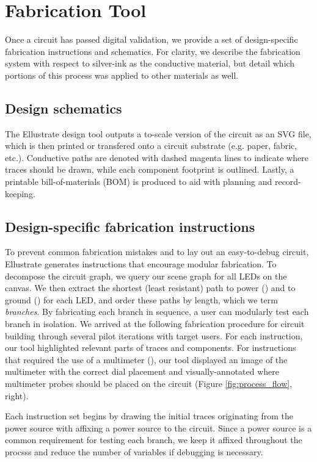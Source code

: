 \documentclass{sigchi}
\begin{document}
\section{Fabrication Tool}
    Once a circuit has passed digital validation, we provide a set of design-specific fabrication instructions and schematics. For clarity, we describe the fabrication system with respect to silver-ink as the conductive material, but detail which portions of this process was applied to other materials as well. 

    \subsection{Design schematics}
        The Ellustrate design tool outputs a to-scale version of the circuit as an SVG file, which is then printed or transfered onto a circuit substrate (e.g. paper, fabric, etc.). Conductive paths are denoted with dashed magenta lines to indicate where traces should be drawn, while each component footprint is outlined. Lastly, a printable bill-of-materials (BOM) is produced to aid with planning and record-keeping.
    \subsection{Design-specific fabrication instructions}
        To prevent common fabrication mistakes and to lay out an easy-to-debug circuit, Ellustrate generates instructions that encourage modular fabrication. To decompose the circuit graph, we query our scene graph for all LEDs on the canvas. We then extract the shortest (least resistant) path to power () and to ground () for each LED, and order these paths by length, which we term \textit{branches}. By fabricating each branch in sequence, a user can modularly test each branch in isolation. We arrived at the following fabrication procedure for circuit building through several pilot iterations with target users. For each instruction, our tool highlighted relevant parts of traces and components. For instructions that required the use of a multimeter (), our tool displayed an image of the multimeter with the correct dial placement and visually-annotated where multimeter probes should be placed on the circuit (Figure \ref{fig:process_flow}, right). 

        Each instruction set begins by drawing the initial traces originating from the power source with affixing a power source to the circuit. Since a power source is a common requirement for testing each branch, we keep it affixed throughout the procsss and reduce the number of variables if debugging is necessary.
        
\end{document}
